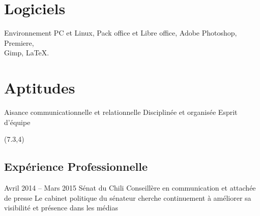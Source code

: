 \documentclass[30pt, french]{tccv}
\begin{document}
\begin{upshape}
\begin{textblock}{6.5}
\begin{mdframed}
\vspace{0.5cm}
\section{Logiciels}
Environnement PC et Linux,
Pack office et Libre office,
Adobe Photoshop, Premiere, \\
Gimp,
\LaTeX.

\vspace{0.5cm}
\section{Aptitudes}
\begin{itemize}[leftmargin=13pt]
  \setlength\itemsep{-3pt} 
  \cvitem[\checkmark]  Aisance communicationnelle et relationnelle 
  \cvitem[\checkmark]  Disciplinée et organisée 
  \cvitem[\checkmark]  Esprit d'équipe 
\end{itemize}



\end{mdframed}
\end{textblock}



\begin{textblock}{13.3}(7.3,4)
\begin{mdframed}
\section{Expérience Professionnelle}


\begin{eventlist}

\setlength{\parskip}{0pt}
\item{\color{text} Avril 2014 -- Mars 2015}
     {Sénat du Chili}
     {Conseillère en communication et attachée de presse}
     \fontsize{9pt}{1em}\color{text}\bodyfontlight\upshape\selectfont
      Le cabinet politique du sénateur  cherche continuement à améliorer sa visibilité et présence dans les médias \\ 


\end{eventlist}
\end{mdframed}
\end{textblock}
\end{upshape}
\end{document}
